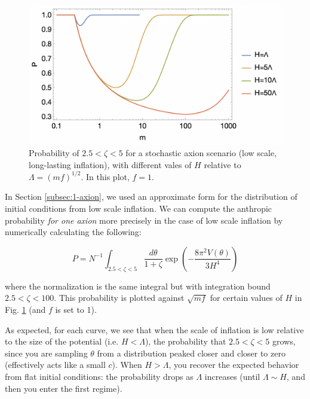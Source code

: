 \documentclass{article}
\begin{document}
\begin{figure}[h]
    \centering
    \includegraphics[width=1\linewidth]{figs/low-scale-inf-prob.jpeg}
    \caption{Probability of $2.5<\zeta<5$ for a stochastic axion scenario (low scale, long-lasting inflation), with different vales of $H$ relative to $\Lambda = (mf)^{1/2}$. In this plot, $f=1$.}
    \label{fig:low-scale-inf-prob}
\end{figure}

In Section \ref{subsec:1-axion}, we used an approximate form for the distribution of initial conditions from low scale inflation. We can compute the anthropic probability \textit{for one axion} more precisely in the case of low scale inflation by numerically calculating the following:

\begin{equation}
    \label{eq:inflation-prob-1axion}
    P = N^{-1}\int_{2.5<\zeta<5} \frac{d\theta}{1+\zeta} \exp{\left(-\frac{8\pi^2V(\theta)}{3H^4}\right)}
\end{equation}

\noindent where the normalization is the same integral but with integration bound $2.5<\zeta<100$. This probability is plotted against $\sqrt{mf}$ for certain values of $H$ in Fig. \ref{fig:low-scale-inf-prob} (and $f$ is set to 1).

As expected, for each curve, we see that when the scale of inflation is low relative to the size of the potential (i.e. $H<\Lambda$), the probability that $2.5<\zeta<5$ grows, since you are sampling $\theta$ from a distribution peaked closer and closer to zero (effectively acts like a small $c$). When $H>\Lambda$, you recover the expected behavior from flat initial conditions: the probability drops as $\Lambda$ increases (until $\Lambda \sim H$, and then you enter the first regime).
\end{document}
